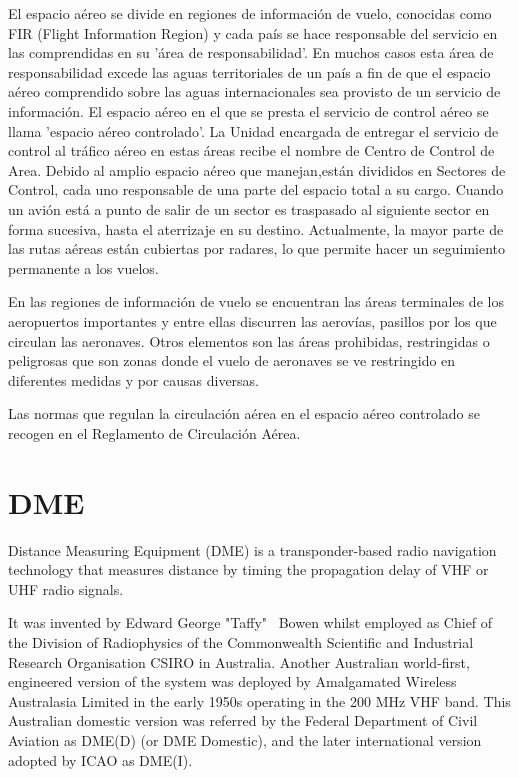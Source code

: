 El espacio aéreo se divide en regiones de información de vuelo, conocidas como FIR (Flight Information Region) y cada país se hace responsable del servicio en las comprendidas en su 'área de responsabilidad'. En muchos casos esta área de responsabilidad excede las aguas territoriales de un país a fin de que el espacio aéreo comprendido sobre las aguas internacionales sea provisto de un servicio de información. El espacio aéreo en el que se presta el servicio de control aéreo se llama 'espacio aéreo controlado'. La Unidad encargada de entregar el servicio de control al tráfico aéreo en estas áreas recibe el nombre de Centro de Control de Area. Debido al amplio espacio aéreo que manejan,están divididos en Sectores de Control, cada uno responsable de una parte del espacio total a su cargo. Cuando un avión está a punto de salir de un sector es traspasado al siguiente sector en forma sucesiva, hasta el aterrizaje en su destino. Actualmente, la mayor parte de las rutas aéreas están cubiertas por radares, lo que permite hacer un seguimiento permanente a los vuelos.

En las regiones de información de vuelo se encuentran las áreas terminales de los aeropuertos importantes y entre ellas discurren las aerovías, pasillos por los que circulan las aeronaves. Otros elementos son las áreas prohibidas, restringidas o peligrosas que son zonas donde el vuelo de aeronaves se ve restringido en diferentes medidas y por causas diversas.

Las normas que regulan la circulación aérea en el espacio aéreo controlado se recogen en el Reglamento de Circulación Aérea.

\newpage

\section*{DME}
\label{DME}

Distance Measuring Equipment (DME) is a transponder-based radio navigation technology that measures distance by timing the propagation delay of VHF or UHF radio signals.

It was invented by Edward George "Taffy" \ Bowen whilst employed as Chief of the Division of Radiophysics of the Commonwealth Scientific and Industrial Research Organisation CSIRO in Australia. Another Australian world-first, engineered version of the system was deployed by Amalgamated Wireless Australasia Limited in the early 1950s operating in the 200 MHz VHF band. This Australian domestic version was referred by the Federal Department of Civil Aviation as DME(D) (or DME Domestic), and the later international version adopted by ICAO as DME(I).


